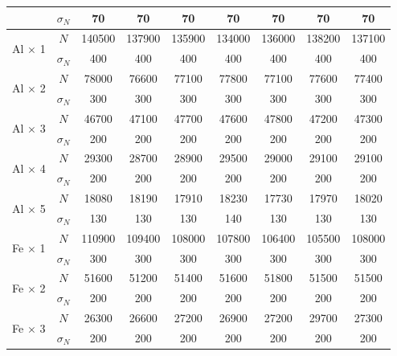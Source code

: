 \documentclass[a4paper,12pt]{article}
\begin{document}
\begin{table}[h!]
\begin{tabular}{|c|c|c|c|c|c|c|c|c|}
                               & $\sigma_N$ & 70     & 70     & 70     & 70     & 70     & 70     & 70     \\ \hline
\multirow{2}{*}{Al $\times$ 1} & $N$        & 140500 & 137900 & 135900 & 134000 & 136000 & 138200 & 137100 \\ \cline{2-9} 
                               & $\sigma_N$ & 400    & 400    & 400    & 400    & 400    & 400    & 400    \\ \hline
\multirow{2}{*}{Al $\times$ 2} & $N$        & 78000  & 76600  & 77100  & 77800  & 77100  & 77600  & 77400  \\ \cline{2-9} 
                               & $\sigma_N$ & 300    & 300    & 300    & 300    & 300    & 300    & 300    \\ \hline
\multirow{2}{*}{Al $\times$ 3} & $N$        & 46700  & 47100  & 47700  & 47600  & 47800  & 47200  & 47300  \\ \cline{2-9} 
                               & $\sigma_N$ & 200    & 200    & 200    & 200    & 200    & 200    & 200    \\ \hline
\multirow{2}{*}{Al $\times$ 4} & $N$        & 29300  & 28700  & 28900  & 29500  & 29000  & 29100  & 29100  \\ \cline{2-9} 
                               & $\sigma_N$ & 200    & 200    & 200    & 200    & 200    & 200    & 200    \\ \hline
\multirow{2}{*}{Al $\times$ 5} & $N$        & 18080  & 18190  & 17910  & 18230  & 17730  & 17970  & 18020  \\ \cline{2-9} 
                               & $\sigma_N$ & 130    & 130    & 130    & 140    & 130    & 130    & 130    \\ \hline
\multirow{2}{*}{Fe $\times$ 1} & $N$        & 110900 & 109400 & 108000 & 107800 & 106400 & 105500 & 108000 \\ \cline{2-9} 
                               & $\sigma_N$ & 300    & 300    & 300    & 300    & 300    & 300    & 300    \\ \hline
\multirow{2}{*}{Fe $\times$ 2} & $N$        & 51600  & 51200  & 51400  & 51600  & 51800  & 51500  & 51500  \\ \cline{2-9} 
                               & $\sigma_N$ & 200    & 200    & 200    & 200    & 200    & 200    & 200    \\ \hline
\multirow{2}{*}{Fe $\times$ 3} & $N$        & 26300  & 26600  & 27200  & 26900  & 27200  & 29700  & 27300  \\ \cline{2-9} 
                               & $\sigma_N$ & 200    & 200    & 200    & 200    & 200    & 200    & 200    \\ \hline

\end{tabular}
\end{table}
\end{document}
